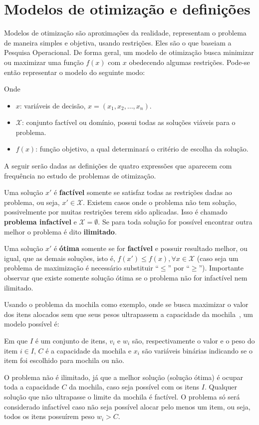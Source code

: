 \section{Modelos de otimização e definições}\label{sec:modelos-de-otimizacao}

Modelos de otimização são aproximações da realidade, representam o problema de maneira simples
e objetiva, usando restrições.
Eles são o que baseiam a Pesquisa Operacional.
De forma geral, um modelo de otimização busca minimizar ou maximizar uma função $f(x)$ com $x$
obedecendo algumas restrições.
Pode-se então representar o modelo do seguinte modo:



Onde

\begin{itemize}
    \item $x$: variáveis de decisão, $x = (x_1, x_2, \dots, x_n)$.
    \item $\mathcal{X}$: conjunto factível ou domínio, possui todas as soluções viáveis para o problema.
    \item $f(x)$: função objetivo, a qual determinará o critério de escolha da solução.
\end{itemize}

A seguir serão dadas as definições de quatro expressões que aparecem com frequência no estudo de
problemas de otimização.

Uma solução $x'$ é \textbf{factível} somente se satisfaz todas as restrições dadas ao problema,
ou seja, $x' \in \mathcal{X}$.
Existem casos onde o problema não tem solução, possivelmente por muitas restrições terem sido
aplicadas.
Isso é chamado \textbf{problema infactível} e $\mathcal{X} = \emptyset$.
Se para toda solução for possível encontrar outra melhor o problema é dito \textbf{ilimitado}.

Uma solução $x'$ é \textbf{ótima} somente se for \textbf{factível} e possuir resultado melhor,
ou igual, que as demais soluções, isto é, $f(x') \le f(x), \forall x \in \mathcal{X}$ (caso seja um
problema de maximização é necessário substituir “$\le$” por “$\ge$”).
Importante observar que existe somente solução ótima se o problema não for infactível nem ilimitado.

Usando o problema da mochila como exemplo, onde se busca maximizar o valor dos itens alocados
sem que seus pesos ultrapassem a capacidade da mochila~\cite{exact-solution-techniques},
um modelo possível é:



Em que $I$ é um conjunto de itens, $v_{i}$ e $w_{i}$ são, respectivamente o valor e o peso do item
$i \in I$, $C$ é a capacidade da mochila e $x_{i}$ são variáveis binárias indicando se o
item foi escolhido para mochila ou não.

O problema não é ilimitado, já que a melhor solução (solução ótima) é ocupar toda a capacidade $C$
da mochila, caso seja possível com os itens $I$.
Qualquer solução que não ultrapasse o limite da mochila é factível.
O problema só será considerado infactível caso não seja possível alocar pelo menos um item, ou seja,
todos os itens possuírem peso $w_i > C$.
